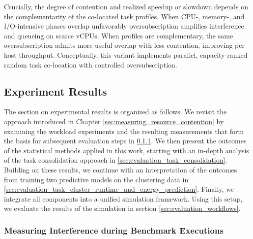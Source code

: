 Crucially, the degree of contention and realized speedup or slowdown depends on the complementarity of the co-located task profiles. When CPU-, memory-, and I/O-intensive phases overlap unfavorably oversubscription amplifies interference and queueing on scarce vCPUs. When profiles are complementary, the same oversubscription admits more useful overlap with less contention, improving per host throughput. Conceptually, this variant implements parallel, capacity-ranked random task co-location with controlled oversubscription.

\subsection{Experiment Results}
\label{sec:experiment_results}
The section on experimental results is organized as follows. We revisit the approach introduced in Chapter \ref{sec:measuring_resource_contention} by examining the workload experiments and the resulting measurements that form the basis for subsequent evaluation steps in \ref{sec:resource_contention_analysis}. We then present the outcomes of the statistical methods applied in this work, starting with an in-depth analysis of the task consolidation approach in \ref{sec:evaluation_task_consolidation}. Building on these results, we continue with an interpretation of the outcomes from training two predictive models on the clustering data in \ref{sec:evaluation_task_cluster_runtime_and_energy_prediction}. Finally, we integrate all components into a unified simulation framework. Using this setup, we evaluate the results of the simulation in section \ref{sec:evaluation_workflows}.
\subsubsection{Measuring Interference during Benchmark Executions}
\label{sec:resource_contention_analysis}



